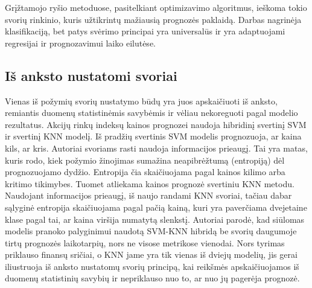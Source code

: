 \documentclass[]{VUMIFTemplateClass}
\begin{document}
    Grįžtamojo ryšio metoduose, pasitelkiant optimizavimo algoritmus, ieškoma tokio svorių rinkinio, kuris užtikrintų mažiausią prognozės paklaidą.
    Darbas nagrinėja klasifikaciją, bet patys svėrimo principai yra universalūs ir yra adaptuojami regresijai ir prognozavimui laiko eilutėse.


    \subsection{Iš anksto nustatomi svoriai}

    Vienas iš požymių svorių nustatymo būdų yra juos apskaičiuoti iš anksto, remiantis duomenų statistinėmis savybėmis ir vėliau nekoreguoti pagal modelio rezultatus.
    Akcijų rinkų indeksų kainos prognozei \cite{chen2017} naudoja hibridinį svertinį SVM ir svertinį KNN modelį.
    Iš pradžių svertinis SVM modelis prognozuoja, ar kaina kils, ar kris.
    Autoriai svoriams rasti naudoja informacijos prieaugį.
    Tai yra matas, kuris rodo, kiek požymio žinojimas sumažina neapibrėžtumą (entropiją) dėl prognozuojamo dydžio.
    Entropija čia skaičiuojama pagal kainos kilimo arba kritimo tikimybes.
    Tuomet atliekama kainos prognozė svertiniu KNN metodu.
    Naudojant informacijos prieaugį, iš naujo randami KNN svoriai, tačiau dabar sąlyginė entropija skaičiuojama pagal pačią kainą, kuri yra paverčiama dvejetaine klase pagal tai, ar kaina viršija numatytą slenkstį.
    Autoriai parodė, kad siūlomas modelis pranoko palyginimui naudotą SVM-KNN hibridą be svorių daugumoje tirtų prognozės laikotarpių, nors ne visose metrikose vienodai.
    Nors tyrimas priklauso finansų sričiai, o KNN jame yra tik vienas iš dviejų modelių, jis gerai iliustruoja iš anksto nustatomų svorių principą, kai reikšmės apskaičiuojamos iš duomenų statistinių savybių ir nepriklauso nuo to, ar nuo jų pagerėja prognozė.
\end{document}
